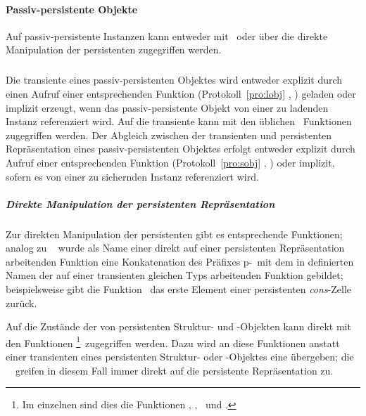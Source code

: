 \paragraph{Passiv-persistente Objekte}
%
Auf pas\-siv-per\-si\-sten\-te Instanzen kann entweder mit
\swizzling\ oder \"{u}ber die direkte Manipulation der persistenten
\representation{} zugegriffen werden.
%
\subparagraph{\protect\swizzling}%
%
Die transiente \representation{} eines passiv-persistenten Objektes wird
entweder explizit durch einen Aufruf einer entsprechenden Funktion
(Protokoll~\ref{pro:lobj} ,
\citepage{\pageref{pro:lobj}}) geladen oder implizit erzeugt, wenn das
passiv-persistente Objekt von einer zu ladenden Instanz referenziert
wird. Auf die transiente \representation{} kann mit den \"{u}blichen
\cl\ Funktionen zugegriffen werden. Der Abgleich zwischen der
transienten und persistenten Re\-pr\"{a}\-sen\-ta\-tion eines
passiv-persistenten Objektes erfolgt entweder explizit durch Aufruf
einer entsprechenden Funktion (Protokoll~\ref{pro:sobj}
, \citepage{\pageref{pro:sobj}}) oder implizit,
sofern es von einer zu sichernden Instanz referenziert wird.
%
\subparagraph{Direkte Manipulation der persistenten Repr\"{a}sentation}
%
Zur direkten Manipulation der persistenten \representations{} gibt es 
entsprechende Funktionen; analog zu \wood\ \cite{bib:wo93} wurde
als Name einer direkt auf einer persistenten Repr\"{a}sentation
arbeitenden Funktion eine Konkatenation des Pr\"{a}fixes
\rglq{}p-\rgrq\ mit dem in \cite{bib:st90} definierten Namen der auf
einer transienten \representation{} gleichen Typs arbeitenden Funktion
gebildet; beispielsweise gibt die Funktion \ das erste
Element einer persistenten {\em cons\/}-Zelle zur\"{u}ck.
%
\par{}Auf die Zust\"{a}nde der \Slt[s]\/ von persistenten Struktur- und
\clos-Objekten kann direkt mit den Funktionen
\footnote{Im einzelnen sind dies die Funktionen
, ,
\ und .}\ zugegriffen werden.
Dazu wird an diese Funktionen anstatt einer transienten
\representation{} eines persistenten Struktur- oder \clos-Objektes
eine \sobjid\/ \"{u}ber\-ge\-ben; die \spc[n]\ \mtd[n]\ greifen in
diesem Fall immer direkt auf die persistente Re\-pr\"{a}\-sen\-ta\-tion
zu.
%
